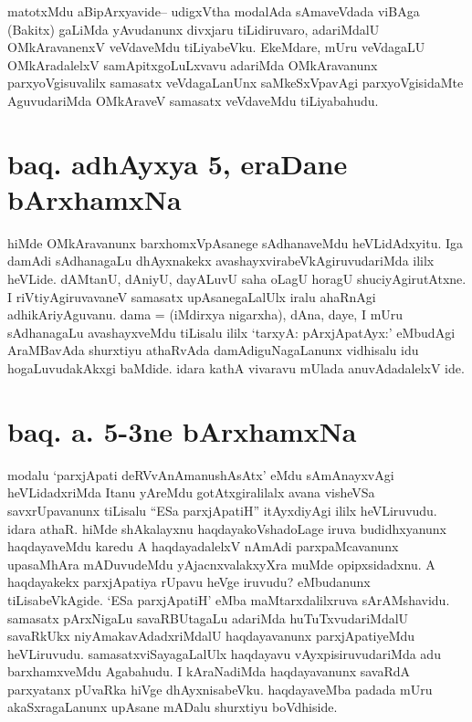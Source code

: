 \begin{artha}
matotxMdu aBipArxyavide{\rm --} udigxVtha modalAda sAmaveVdada viBAga (Bakitx) gaLiMda yAvudanunx divxjaru tiLidiruvaro, adariMdalU OMkAravanenxV veVdaveMdu tiLiyabeVku. EkeMdare, mUru veVdagaLU OMkAradalelxV samApitxgoLuLxvavu adariMda OMkAravanunx parxyoVgisuvalilx samasatx veVdagaLanUnx saMkeSxVpavAgi parxyoVgisidaMte AguvudariMda OMkAraveV samasatx veVdaveMdu tiLiyabahudu.
\end{artha}

\section*{baq. adhAyxya 5, eraDane bArxhamxNa}

\begin{artha}
hiMde OMkAravanunx barxhomxVpAsanege sAdhanaveMdu heVLidAdxyitu. Iga damAdi sAdhanagaLu dhAyxnakekx avashayxvirabeVkAgiruvudariMda ililx heVLide. dAMtanU, dAniyU, dayALuvU saha oLagU horagU shuciyAgirutAtxne. I riVtiyAgiruvavaneV samasatx upAsanegaLalUlx iralu ahaRnAgi adhikAriyAguvanu. dama = (iMdirxya nigarxha), dAna, daye, I mUru sAdhanagaLu avashayxveMdu tiLisalu ililx `tarxyA: pArxjApatAyx:' eMbudAgi AraMBavAda shurxtiyu athaRvAda damAdiguNagaLanunx vidhisalu idu hogaLuvudakAkxgi baMdide. idara kathA vivaravu mUlada anuvAdadalelxV ide.
\end{artha}

\section*{baq. a. 5-3ne bArxhamxNa}

\begin{artha}
modalu `parxjApati deRVvAnAmanushAsAtx' eMdu sAmAnayxvAgi heVLidadxriMda Itanu yAreMdu gotAtxgiralilalx avana visheVSa savxrUpavanunx tiLisalu ``ESa parxjApatiH'' itAyxdiyAgi ililx heVLiruvudu. idara athaR. hiMde shAkalayxnu haqdayakoVshadoLage iruva budidhxyanunx haqdayaveMdu karedu A haqdayadalelxV nAmAdi parxpaMcavanunx upasaMhAra mADuvudeMdu yAjacnxvalakxyXra muMde opipxsidadxnu. A haqdayakekx parxjApatiya rUpavu heVge iruvudu? eMbudanunx tiLisabeVkAgide. `ESa parxjApatiH' eMba maMtarxdalilxruva sArAMshavidu. samasatx pArxNigaLu savaRBUtagaLu adariMda huTuTxvudariMdalU savaRkUkx niyAmakavAdadxriMdalU haqdayavanunx parxjApatiyeMdu heVLiruvudu. samasatxviSayagaLalUlx haqdayavu vAyxpisiruvudariMda adu barxhamxveMdu Agabahudu. I kAraNadiMda haqdayavanunx savaRdA parxyatanx pUvaRka hiVge dhAyxnisabeVku. haqdayaveMba padada mUru akaSxragaLanunx upAsane mADalu shurxtiyu boVdhiside.
\end{artha}


